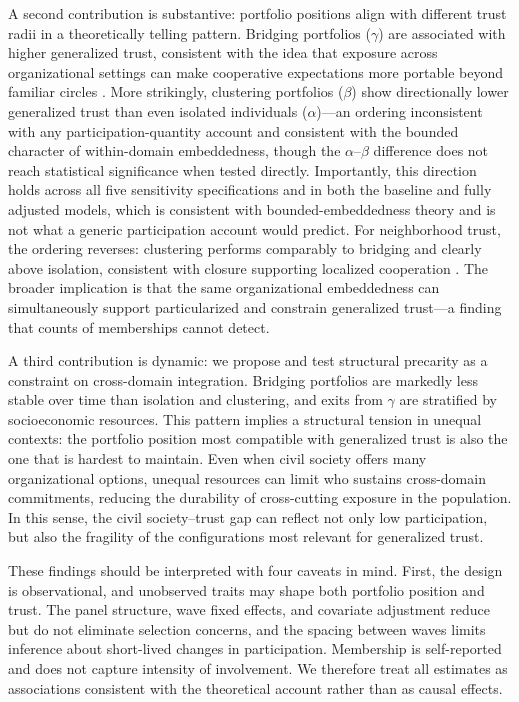 A second contribution is substantive: portfolio positions align with different trust radii in a theoretically telling pattern. Bridging portfolios ($\gamma$) are associated with higher generalized trust, consistent with the idea that exposure across organizational settings can make cooperative expectations more portable beyond familiar circles \parencite{rapp_teaching_2015}. More strikingly, clustering portfolios ($\beta$) show directionally lower generalized trust than even isolated individuals ($\alpha$)---an ordering inconsistent with any participation-quantity account and consistent with the bounded character of within-domain embeddedness, though the $\alpha$--$\beta$ difference does not reach statistical significance when tested directly. Importantly, this direction holds across all five sensitivity specifications and in both the baseline and fully adjusted models, which is consistent with bounded-embeddedness theory and is not what a generic participation account would predict. For neighborhood trust, the ordering reverses: clustering performs comparably to bridging and clearly above isolation, consistent with closure supporting localized cooperation \parencite{coleman_social_1988,portes_social_1998}. The broader implication is that the same organizational embeddedness can simultaneously support particularized and constrain generalized trust---a finding that counts of memberships cannot detect.

A third contribution is dynamic: we propose and test structural precarity as a constraint on cross-domain integration. Bridging portfolios are markedly less stable over time than isolation and clustering, and exits from $\gamma$ are stratified by socioeconomic resources. This pattern implies a structural tension in unequal contexts: the portfolio position most compatible with generalized trust is also the one that is hardest to maintain. Even when civil society offers many organizational options, unequal resources can limit who sustains cross-domain commitments, reducing the durability of cross-cutting exposure in the population. In this sense, the civil society–trust gap can reflect not only low participation, but also the fragility of the configurations most relevant for generalized trust.

These findings should be interpreted with four caveats in mind. First, the design is observational, and unobserved traits may shape both portfolio position and trust. The panel structure, wave fixed effects, and covariate adjustment reduce but do not eliminate selection concerns, and the spacing between waves limits inference about short-lived changes in participation. Membership is self-reported and does not capture intensity of involvement. We therefore treat all estimates as associations consistent with the theoretical account rather than as causal effects.

